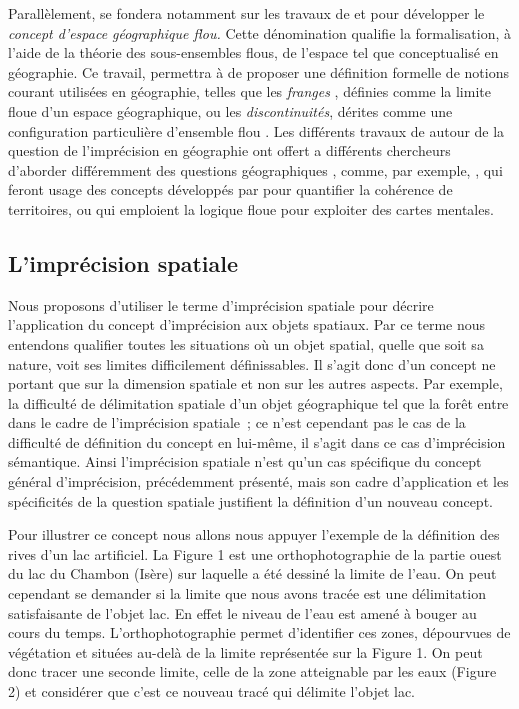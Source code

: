 Parallèlement, \textcite{Rolland-May1984,Rolland-May1987} se fondera
notamment sur les travaux de  et  pour développer
le \emph{concept d’espace géographique flou.} Cette dénomination
qualifie la formalisation, à l’aide de la théorie des sous-ensembles
flous, de l’espace tel que conceptualisé en géographie. Ce travail,
permettra à  de proposer une définition formelle de
notions courant utilisées en géographie, telles que les \emph{franges}
\autocite{Rolland-May1987}, définies comme la limite floue d’un espace
géographique, ou les \emph{discontinuités}, dérites comme une
configuration particulière d’ensemble flou
\autocite{Rolland-May2003}. Les différents travaux de
 autour de la question de l’imprécision en géographie
ont offert a différents chercheurs d’aborder différemment des
questions géographiques \autocite{Dutozia2014}, comme, par exemple,
\textcite{deRuffray2004}, qui feront usage des concepts développés par
 pour quantifier la cohérence de territoires, ou
\textcite{Didelon2013} qui emploient la logique floue pour exploiter
des cartes mentales.

\subsection{L’imprécision spatiale}

Nous proposons d’utiliser le terme d’imprécision spatiale pour décrire
l’application du concept d’imprécision aux objets spatiaux. Par ce
terme nous entendons qualifier toutes les situations où un objet
spatial, quelle que soit sa nature, voit ses limites difficilement
définissables. Il s’agit donc d’un concept ne portant que sur la
dimension spatiale et non sur les autres aspects. Par exemple, la
difficulté de délimitation spatiale d’un objet géographique tel que la
forêt entre dans le cadre de l’imprécision spatiale ; ce n’est
cependant pas le cas de la difficulté de définition du concept en
lui-même, il s’agit dans ce cas d’imprécision sémantique. Ainsi
l’imprécision spatiale n’est qu’un cas spécifique du concept général
d’imprécision, précédemment présenté, mais son cadre d’application et
les spécificités de la question spatiale justifient la définition d’un
nouveau concept.

Pour illustrer ce concept nous allons nous appuyer l’exemple de la
définition des rives d’un lac artificiel. La Figure 1 est une
orthophotographie de la partie ouest du lac du Chambon (Isère) sur
laquelle a été dessiné la limite de l’eau. On peut cependant se
demander si la limite que nous avons tracée est une délimitation
satisfaisante de l’objet lac. En effet le niveau de l’eau est amené à
bouger au cours du temps. L’orthophotographie permet d’identifier ces
zones, dépourvues de végétation et situées au-delà de la limite
représentée sur la Figure 1. On peut donc tracer une seconde limite,
celle de la zone atteignable par les eaux (Figure 2) et considérer que
c’est ce nouveau tracé qui délimite l’objet lac.

